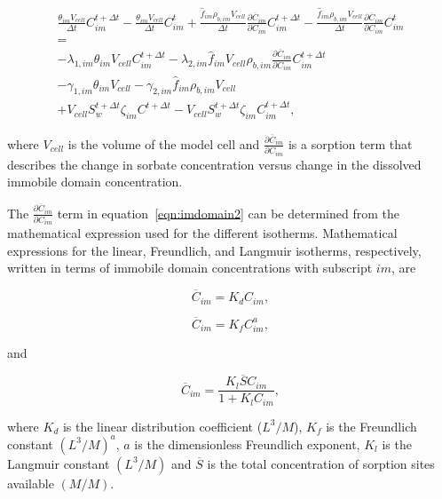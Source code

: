 \begin{equation}
\label{eqn:imdomain2}
\begin{split}
\frac{\theta_{im} V_{cell}}{\Delta t} C_{im}^{t + \Delta t} - 
\frac{\theta_{im} V_{cell}}{\Delta t} C_{im}^t 
+ \frac{\hat{f}_{im} \rho_{b,im} V_{cell}}{\Delta t} \frac{\partial \overline{C}_{im}}{\partial C_{im}} C_{im}^{t + \Delta t}
-  \frac{\hat{f}_{im} \rho_{b,im} V_{cell}}{\Delta t} \frac{\partial \overline{C}_{im}}{\partial C_{im}} C_{im}^{t} \\
= \\
- \lambda_{1,im} \theta_{im} V_{cell} C_{im}^{t + \Delta t}
- \lambda_{2,im} \hat{f}_{im} V_{cell} \rho_{b,im} \frac{\partial \overline{C}_{im}}{\partial C_{im}} C_{im}^{t + \Delta t} \\
- \gamma_{1,im} \theta_{im} V_{cell}  
- \gamma_{2,im} \hat{f}_{im} \rho_{b,im} V_{cell} \\
+ V_{cell} S_w^{t + \Delta t}  \zeta_{im} C^{t + \Delta t}
- V_{cell} S_w^{t + \Delta t}  \zeta_{im} C_{im}^{t + \Delta t} ,
\end{split}
\end{equation}

\noindent where $V_{cell}$ is the volume of the model cell and $\frac{\partial \overline{C}_{im}}{\partial C_{im}}$ is a sorption term that describes the change in sorbate concentration versus change in the dissolved immobile domain concentration.

The $\frac{\partial \overline{C}_{im}}{\partial C_{im}}$ term in equation~\ref{eqn:imdomain2} can be determined from the mathematical expression used for the different isotherms.   Mathematical expressions for the linear, Freundlich, and Langmuir isotherms, respectively, written in terms of immobile domain concentrations with subscript $im$, are

\begin{equation}
\label{eqn:linear}
\overline{C}_{im} = K_d C_{im},
\end{equation}

\begin{equation}
\label{eqn:freundlich}
\overline{C}_{im} = K_f C_{im}^a,
\end{equation}

\noindent and

\begin{equation}
\label{eqn:langmuir}
\overline{C}_{im} = \frac{K_l \overline{S} C_{im}}{1 + K_l C_{im}},
\end{equation}

\noindent where $K_d$ is the linear distribution coefficient ($L^3/M$), $K_f$ is the Freundlich constant $(L^3 / M)^a$, $a$ is the dimensionless Freundlich exponent, $K_l$ is the Langmuir constant $(L^3 / M)$ and $\overline{S}$ is the total concentration of sorption sites available $(M/M)$.


